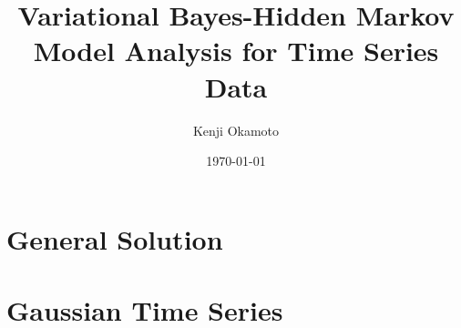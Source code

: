 \documentclass[a4paper,11pt,fleqn]{report}
\begin{document}
\title{ Variational Bayes-Hidden Markov Model Analysis for Time Series Data %
}
\author{ Kenji Okamoto }
\date{\today}
\maketitle

\tableofcontents

\chapter{ General Solution }





%
%
%

%
%

\chapter{ Gaussian Time Series }




%
\end{document}
